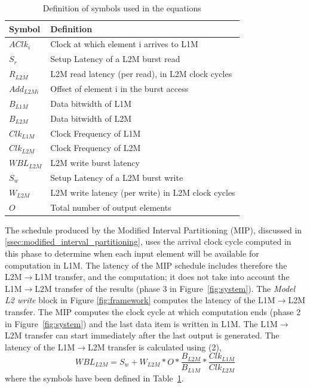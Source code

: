 \begin{table}[]
\centering
\scriptsize
\begin{tabular}{|l|l|}
\hline
\textbf{Symbol} & \textbf{Definition}                                           \\ \hline
$AClk_i$           & Clock at which element i arrives to L1M                \\
$S_r$             & Setup Latency of a L2M burst read                          \\
$R_{L2M}$       & L2M read latency (per read), in L2M clock cycles   \\
$Add_{L2Mi}$     & Offset of element i in the burst access \\
$B_{L1M}$        & Data bitwidth of L1M                                       \\
$B_{L2M}$        & Data bitwidth of L2M                                       \\
$Clk_{L1M}$      & Clock Frequency of L1M                                     \\
$Clk_{L2M}$      & Clock Frequency of L2M                                     \\
$WBL_{L2M}$      & L2M write burst latency                                    \\
$S_w$             & Setup Latency of a L2M burst write                         \\
$W_{L2M}$       & L2M write latency (per write) in L2M clock cycles  \\
$O$                 & Total number of output elements                            \\ \hline
\end{tabular}
\caption{\small Definition of symbols used in the equations}
\label{table:equation}
\squeezeup
\squeezeup
\end{table}
The schedule produced by the Modified Interval Partitioning (MIP), discussed in \ref{ssec:modified_interval_partitioning}, uses the arrival clock cycle computed in this phase to determine when each input element will be available for computation in L1M. The latency of the MIP schedule includes therefore the L2M$\rightarrow$L1M transfer, and the computation; it does not take into account the L1M$\rightarrow$L2M transfer of the results (phase 3 in Figure~\ref{fig:system}).
The \textit{Model L2 write} block in Figure \ref{fig:framework} computes the latency of the L1M$\rightarrow$L2M transfer. The MIP computes the clock cycle at which computation ends (phase 2 in Figure~\ref{fig:system}) and the last data item is written in L1M. The L1M$\rightarrow$L2M transfer can start immediately after the last output is generated.
The latency of the L1M$\rightarrow$L2M transfer is calculated using (2),
\begin{equation}
    WBL_{L2M} = S_w + W_{L2M} * O * \frac{B_{L2M}}{B_{L1M}} * \frac{Clk_{L1M}}{Clk_{L2M}}
\end{equation}
where the symbols have been defined in Table~\ref{table:equation}.


